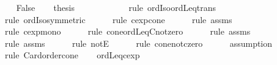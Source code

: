 \begin{isabellebody}
\isanewline
\ \ \isamarkupfalse%
\ False\isanewline
\ \ \isamarkupfalse%
\ {\isacharquery}{\kern0pt}thesis\isanewline
\ \ \ \ \isamarkupfalse%
\ {\isacharminus}{\kern0pt}\isanewline
\ \ \ \ \isamarkupfalse%
\ {\isacharparenleft}{\kern0pt}rule\ ordIso{\isacharunderscore}{\kern0pt}ordLeq{\isacharunderscore}{\kern0pt}trans{\isacharparenright}{\kern0pt}\isanewline
\ \ \ \ \isamarkupfalse%
\ {\isacharparenleft}{\kern0pt}rule\ ordIso{\isacharunderscore}{\kern0pt}symmetric{\isacharparenright}{\kern0pt}\isanewline
\ \ \ \ \isamarkupfalse%
\ {\isacharparenleft}{\kern0pt}rule\ cexp{\isacharunderscore}{\kern0pt}cone{\isacharparenright}{\kern0pt}\isanewline
\ \ \ \ \isamarkupfalse%
\ {\isacharparenleft}{\kern0pt}rule\ assms{\isacharparenleft}{\kern0pt}{}{\isacharparenright}{\kern0pt}{\isacharparenright}{\kern0pt}\isanewline
\ \ \ \ \isamarkupfalse%
\ {\isacharparenleft}{\kern0pt}rule\ cexp{\isacharunderscore}{\kern0pt}mono{}{\isacharparenright}{\kern0pt}\isanewline
\ \ \ \ \isamarkupfalse%
\ {\isacharparenleft}{\kern0pt}rule\ cone{\isacharunderscore}{\kern0pt}ordLeq{\isacharunderscore}{\kern0pt}Cnotzero{\isacharparenright}{\kern0pt}\isanewline
\ \ \ \ \isamarkupfalse%
\ {\isacharparenleft}{\kern0pt}rule\ assms{\isacharparenleft}{\kern0pt}{}{\isacharparenright}{\kern0pt}{\isacharparenright}{\kern0pt}\isanewline
\ \ \ \ \isamarkupfalse%
\ {\isacharparenleft}{\kern0pt}rule\ assms{\isacharparenleft}{\kern0pt}{}{\isacharparenright}{\kern0pt}{\isacharparenright}{\kern0pt}\isanewline
\ \ \ \ \isamarkupfalse%
\ {\isacharparenleft}{\kern0pt}rule\ notE{\isacharparenright}{\kern0pt}\isanewline
\ \ \ \ \isamarkupfalse%
\ {\isacharparenleft}{\kern0pt}rule\ cone{\isacharunderscore}{\kern0pt}not{\isacharunderscore}{\kern0pt}czero{\isacharparenright}{\kern0pt}\isanewline
\ \ \ \ \isamarkupfalse%
\ assumption\isanewline
\ \ \ \ \isamarkupfalse%
\ {\isacharparenleft}{\kern0pt}rule\ Card{\isacharunderscore}{\kern0pt}order{\isacharunderscore}{\kern0pt}cone{\isacharparenright}{\kern0pt}\isanewline
\ \ \isamarkupfalse%
\isanewline
{}\isamarkupfalse%
%
\endisatagproof
{\isafoldproof}%
%
\isadelimproof
\isanewline
%
\endisadelimproof
\isanewline
{}\isamarkupfalse%
\ ordLeq{\isacharunderscore}{\kern0pt}cexp{}{\isacharcolon}{\kern0pt}\isanewline

\end{isabellebody}
